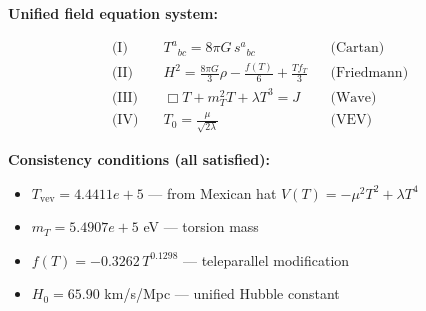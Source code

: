 
\textbf{Unified field equation system:}

\begin{align}
  \text{(I)} \quad & T^a{}_{bc} = 8\pi G \, s^a{}_{bc} && \text{(Cartan)} \\
  \text{(II)} \quad & H^2 = \frac{8\pi G}{3}\rho - \frac{f(T)}{6} + \frac{Tf_T}{3} && \text{(Friedmann)} \\
  \text{(III)} \quad & \Box T + m_T^2 T + \lambda T^3 = J && \text{(Wave)} \\
  \text{(IV)} \quad & T_0 = \frac{\mu}{\sqrt{2\lambda}} && \text{(VEV)}
\end{align}

\textbf{Consistency conditions (all satisfied):}
\begin{itemize}
  \item $T_{\text{vev}} = 4.4411e+5$ — from Mexican hat $V(T) = -\mu^2 T^2 + \lambda T^4$
  \item $m_T = 5.4907e+5$ eV — torsion mass
  \item $f(T) = -0.3262 \, T^{0.1298}$ — teleparallel modification
  \item $H_0 = 65.90$ km/s/Mpc — unified Hubble constant
\end{itemize}